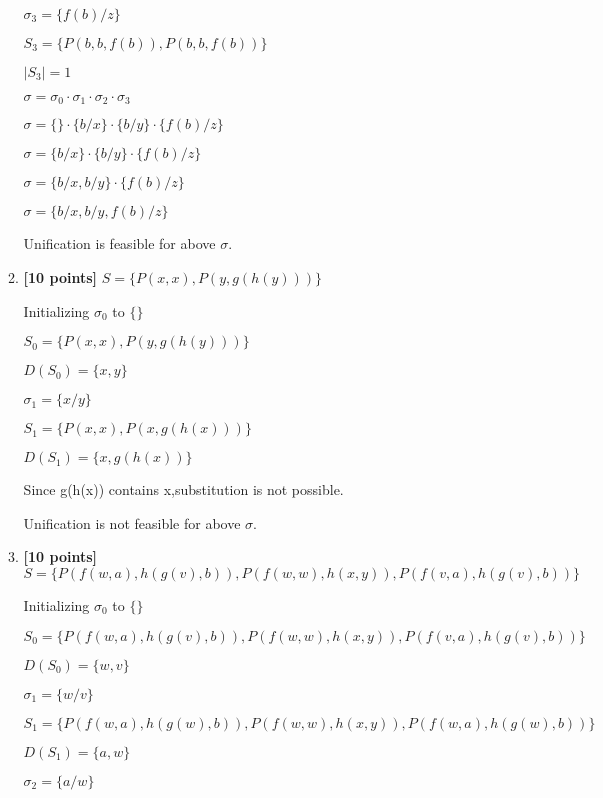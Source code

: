 \documentclass{article}
\begin{document}
\begin{enumerate}
\begin{enumerate}
\begin{answer}
		$\sigma_3 = \{f(b)/z\}$
		
		$S_3 = \{P(b, b, f(b)), P(b, b, f(b))\}$
		
		$|S_3| = 1$	
	
		\bigskip
		
		$\sigma = \sigma_0 \cdot{} \sigma_1 \cdot{} \sigma_2 \cdot{} \sigma_3$
		
		$\sigma = \{\} \cdot{} \{b/x\}  \cdot{} \{b/y\} \cdot{} \{f(b)/z\}$
		
		$\sigma = \{b/x\}  \cdot{} \{b/y\} \cdot{} \{f(b)/z\}$
		
		$\sigma = \{b/x, b/y\} \cdot{} \{f(b)/z\}$
		
		$\sigma = \{b/x, b/y, f(b)/z\}$
		
		Unification is feasible for above $\sigma$.
    \end{answer}

  \item \textbf{[10 points]}
    $S = \{ P(x,x), P(y,g(h(y))) \}$
        \begin{answer}
		Initializing $\sigma_0$ to $\{\}$
		
		$S_0 = \{P(x, x), P(y, g(h(y)))\}$
		
		$D(S_0) = \{x, y\}$
		\bigskip
		
		$\sigma_1 = \{x/y\}$
		
		$S_1 = \{P(x, x), P(x, g(h(x)))\}$
		
		$D(S_1) = \{x, g(h(x))\}$
		
		Since g(h(x)) contains x,substitution is not possible.
		
		Unification is not feasible for above $\sigma$.
    \end{answer}
  \item \textbf{[10 points]}
    $S = \{ P(f(w,a),h(g(v),b)), P(f(w,w),h(x,y)), P(f(v,a),h(g(v),b)) \}$
      
      \begin{answer}
      
		Initializing $\sigma_0$ to $\{\}$
		
		$S_0 = \{P(f(w, a), h(g(v),b)), P(f(w, w), h(x, y)), P(f(v, a), h(g(v), b))\}$
		
		$D(S_0) = \{w, v\}$
		\bigskip
		
		$\sigma_1 = \{w/v\}$
		
		$S_1 = \{P(f(w, a), h(g(w),b)), P(f(w, w), h(x, y)), P(f(w, a), h(g(w), b))\}$
		
		$D(S_1) = \{a, w\}$
		\bigskip
		
		$\sigma_2 = \{a/w\}$


\end{answer}
\end{enumerate}
\end{enumerate}
\end{document}
